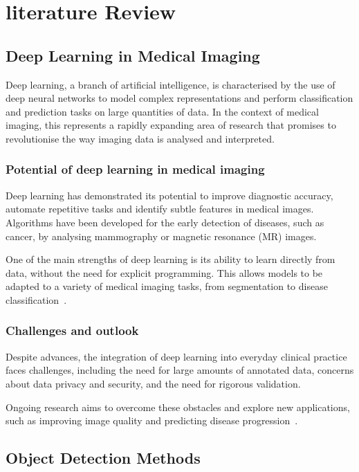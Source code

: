 \documentclass[12pt,oneside]{book} %
\begin{document}
\chapter{literature Review}

\section{Deep Learning in Medical Imaging}

Deep learning, a branch of artificial intelligence, is characterised by the use
of deep neural networks to model complex representations and perform
classification and prediction tasks on large quantities of data. In the context
of medical imaging, this represents a rapidly expanding area of research that
promises to revolutionise the way imaging data is analysed and interpreted.

\subsection{Potential of deep learning in medical imaging}

Deep learning has demonstrated its potential to improve diagnostic accuracy,
automate repetitive tasks and identify subtle features in medical images.
Algorithms have been developed for the early detection of diseases, such as
cancer, by analysing mammography or magnetic resonance (MR) images.

One of the main strengths of deep learning is its ability to learn directly
from data, without the need for explicit programming. This allows models to be
adapted to a variety of medical imaging tasks, from segmentation to disease
classification~\cite{LITJENS201760}.

\subsection{Challenges and outlook}

Despite advances, the integration of deep learning into everyday clinical
practice faces challenges, including the need for large amounts of annotated
data, concerns about data privacy and security, and the need for rigorous
validation.

Ongoing research aims to overcome these obstacles and explore new applications,
such as improving image quality and predicting disease
progression~\cite{Shen2017}.

\section{Object Detection Methods}
\end{document}
